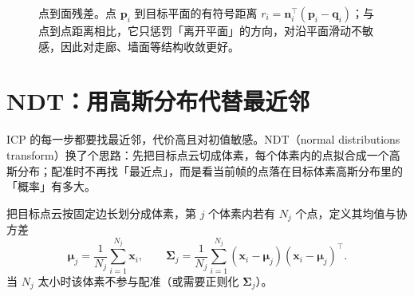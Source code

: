 \begin{figure}[htbp]
  \centering
  \caption{点到面残差。点 $\bm{p}_i$ 到目标平面的有符号距离 $r_i=\bm{n}_i^{\top}(\bm{p}_i-\bm{q}_i)$；与点到点距离相比，它只惩罚「离开平面」的方向，对沿平面滑动不敏感，因此对走廊、墙面等结构收敛更好。}
  \label{fig:07-p2plane}
\end{figure}

\section{NDT：用高斯分布代替最近邻}\label{sec:07-ndt}

ICP 的每一步都要找最近邻，代价高且对初值敏感。NDT（normal distributions transform）换了个思路：先把目标点云切成体素，每个体素内的点拟合成一个高斯分布；配准时不再找「最近点」，而是看当前帧的点落在目标体素高斯分布里的「概率」有多大。

\begin{definition}
把目标点云按固定边长划分成体素，第 $j$ 个体素内若有 $N_j$ 个点，定义其均值与协方差
\begin{equation}
  \bm{\mu}_j=\frac{1}{N_j}\sum_{i=1}^{N_j}\bm{x}_i,
  \qquad
  \bm{\Sigma}_j=\frac{1}{N_j}\sum_{i=1}^{N_j}\left(\bm{x}_i-\bm{\mu}_j\right)\left(\bm{x}_i-\bm{\mu}_j\right)^{\top}.
  \label{eq:07-ndt-gauss}
\end{equation}
当 $N_j$ 太小时该体素不参与配准（或需要正则化 $\bm{\Sigma}_j$）。
\end{definition}

